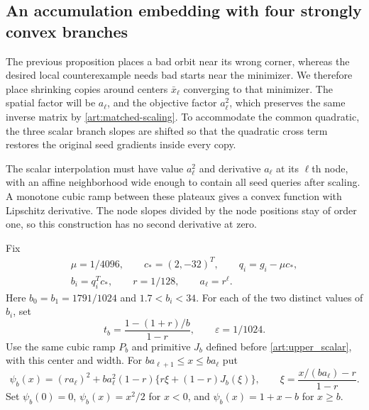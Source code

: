 \subsection{An accumulation embedding with four strongly convex branches}
The previous proposition places a bad orbit near its wrong corner,
whereas the desired local counterexample needs bad starts near the
minimizer. We therefore place shrinking copies around centers $\bar x_\ell$
converging to that minimizer. The spatial factor will be $a_\ell$, and the
objective factor $a_\ell^2$, which preserves the same inverse matrix by
\eqref{art:matched-scaling}. To accommodate the common quadratic, the
three scalar branch slopes are shifted so that the quadratic cross term
restores the original seed gradients inside every copy.

The scalar interpolation must have value $a_\ell^2$ and derivative $a_\ell$
at its $\ell$th node, with an affine neighborhood wide enough to contain
all seed queries after scaling. A monotone cubic ramp between these
plateaux gives a convex function with Lipschitz derivative. The node
slopes divided by the node positions stay of order one, so this
construction has no second derivative at zero.

Fix
\begin{gather*}
 \mu=1/4096,\qquad c_*=(2,-32)^T,\qquad q_i=g_i-\mu c_*,\\
 b_i=q_i^Tc_*,\qquad r=1/128,\qquad a_\ell=r^\ell.
\end{gather*}
Here $b_0=b_1=1791/1024$ and $1.7<b_i<34$. For each of the two distinct
values of $b_i$, set
\[
 t_b=\frac{1-(1+r)/b}{1-r},\qquad\varepsilon=1/1024.
\]
Use the same cubic ramp $P_b$ and primitive $J_b$ defined before
\eqref{art:upper_scalar}, with this center and width. For
$ba_{\ell+1}\le x\le ba_\ell$ put
\begin{equation}\label{art:lower_scalar}
 \psi_b(x)=(ra_\ell)^2+ba_\ell^2(1-r)
       \{r\xi+(1-r)J_b(\xi)\},\qquad
 \xi=\frac{x/(ba_\ell)-r}{1-r}.
\end{equation}
Set $\psi_b(0)=0$, $\psi_b(x)=x^2/2$ for $x<0$, and
$\psi_b(x)=1+x-b$ for $x\ge b$.

